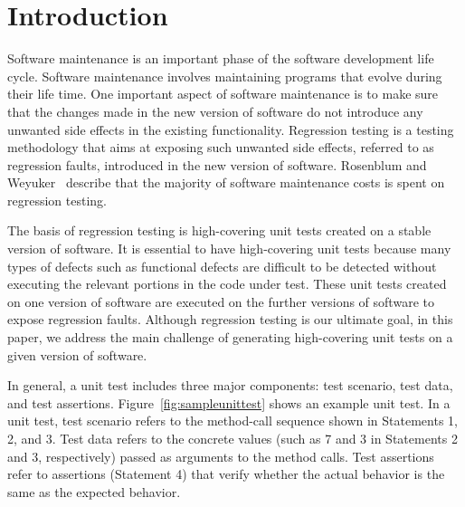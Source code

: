 \section{Introduction}
\label{sec:intro}

Software maintenance is an important phase of the software development life cycle. Software maintenance involves maintaining programs that evolve during their life time. One important aspect of software maintenance is to make sure that the changes made in the new version of software do not introduce any unwanted side effects in the existing functionality. Regression testing is a testing methodology that aims at exposing such unwanted side effects, referred to as regression faults, introduced in the new version of software. Rosenblum and Weyuker~\cite{rosenblum96:regression} describe that the majority of software maintenance costs is spent on regression testing.

The basis of regression testing is high-covering unit tests created on a stable version of software. It is essential to have high-covering unit tests because many types of defects such as functional defects are difficult to be detected without executing the relevant portions in the code under test. These unit tests created on one version of software are executed on the further versions of software to expose regression faults. Although regression testing is our ultimate goal, in this paper, we address
the main challenge of generating high-covering unit tests on a given version of software.

In general, a unit test includes three major components: test scenario, test data, and test assertions. Figure~\ref{fig:sampleunittest} shows an example unit test. In a unit test, test scenario refers to the method-call sequence shown in Statements 1, 2, and 3. Test data refers to the concrete values (such as 7 and 3 in Statements 2 and 3, respectively) passed as arguments to the method calls. Test assertions refer to assertions (Statement 4) that verify whether the actual behavior is the same as the expected behavior.

